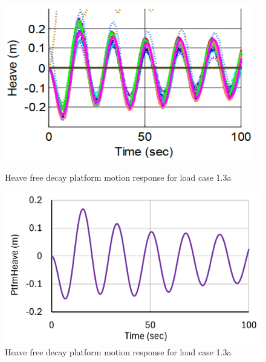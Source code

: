 \documentclass[a4paper, 11pt]{article}
\begin{document}
\begin{figure}[H]
    \begin{minipage}{0.48\textwidth}
        \centering
        \includegraphics[width=0.97\textwidth]{1.3a_heave.png}
        \caption{\small Heave free decay platform motion response for load case 1.3a \cite{Robertson2014}}
        \label{fig:1.3a_heave}
    \end{minipage}
    \hfill
    \begin{minipage}{0.49\textwidth}
        \centering
        \includegraphics[width=1\textwidth]{1.3a_heave_mine.png}
        \caption{\small Heave free decay platform motion response for load case 1.3a}
        \label{fig:1.3a_heave_mine}
    \end{minipage}
\end{figure}
\end{document}

